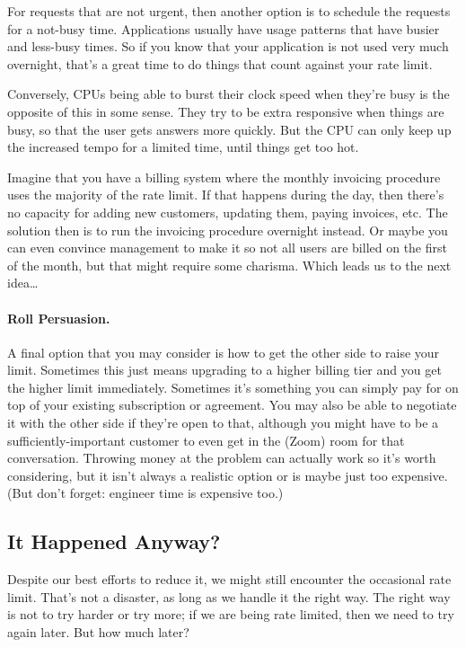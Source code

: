 For requests that are not urgent, then another option is to schedule the requests for a not-busy time. Applications usually have usage patterns that have busier and less-busy times. So if you know that your application is not used very much overnight, that's a great time to do things that count against your rate limit.

Conversely, CPUs being able to burst their clock speed when they're busy is the opposite of this in some sense. They try to be extra responsive when things are busy, so that the user gets answers more quickly. But the CPU can only keep up the increased tempo for a limited time, until things get too hot.

Imagine that you have a billing system where the monthly invoicing procedure uses the majority of the rate limit. If that happens during the day, then there's no capacity for adding new customers, updating them, paying invoices, etc. The solution then is to run the invoicing procedure overnight instead. Or maybe you can even convince management to make it so not all users are billed on the first of the month, but that might require some charisma. Which leads us to the next idea\ldots

\paragraph{Roll Persuasion.}
A final option that you may consider is how to get the other side to raise your limit. Sometimes this just means upgrading to a higher billing tier and you get the higher limit immediately. Sometimes it's something you can simply pay for on top of your existing subscription or agreement. You may also be able to negotiate it with the other side if they're open to that, although you might have to be a sufficiently-important customer to even get in the (Zoom) room for that conversation. Throwing money at the problem can actually work so it's worth considering, but it isn't always a realistic option or is maybe just too expensive. (But don't forget: engineer time is expensive too.)

\subsection*{It Happened Anyway?}

Despite our best efforts to reduce it, we might still encounter the occasional rate limit. That's not a disaster, as long as we handle it the right way. The right way is not to try harder or try more; if we are being rate limited, then we need to try again later. But how much later?

